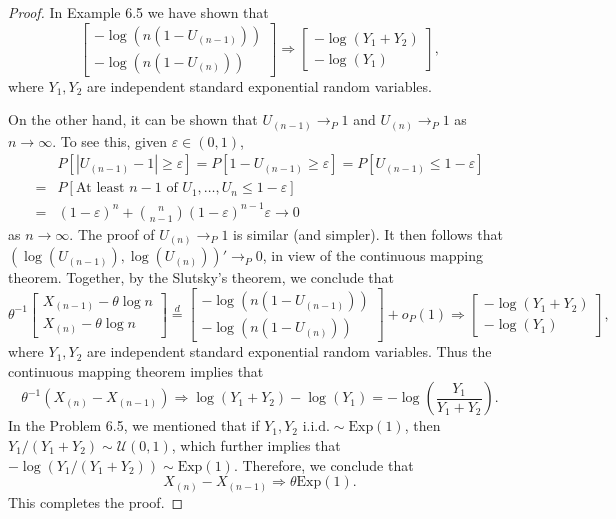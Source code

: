 \documentclass{article}
\newcommand{\eps}{\varepsilon}
\theoremstyle{definition}
\theoremstyle{plain}
\theoremstyle{remark}
\begin{document}
\begin{description}
\begin{description}
\begin{proof}
In Example 6.5 we have shown that 
\begin{equation*}
    \begin{bmatrix} 
    -\log(n(1 - U_{(n - 1)})) \\
    -\log(n(1 - U_{(n)})) 
    \end{bmatrix} \Rightarrow 
    \begin{bmatrix} 
    -\log(Y_1 + Y_2) \\
    -\log(Y_1)
    \end{bmatrix},
\end{equation*}
where $Y_1, Y_2$ are independent standard exponential random variables. 

On the other hand, it can be shown that $U_{(n - 1)} \to_P 1$ and $U_{(n)} 
\to_P 1$ as $n \to \infty$. To see this, given $\eps \in (0, 1)$, 
\begin{align*}
   & P[|U_{(n - 1)} - 1| \geq \eps] = P[1 - U_{(n - 1)} \geq \eps] = 
   P[U_{(n - 1)} \leq 1 - \eps] \\
   = & P[\text{At least $n - 1$ of } U_1, \ldots, U_n \leq 1 - \eps] \\
   = & (1 - \eps)^n + \binom{n}{n - 1}(1 - \eps)^{n - 1}\eps \to 0
\end{align*}
as $n \to \infty$. The proof of $U_{(n)} \to_P 1$ is similar (and simpler).
It then follows that $(\log(U_{(n - 1)}), \log(U_{(n)}))' \to_P 0$, in view of
the continuous mapping theorem. Together, by the Slutsky's theorem, we conclude
that
\begin{equation*}
    \theta^{-1}\begin{bmatrix}
    X_{(n - 1)} - \theta\log n \\
    X_{(n)} - \theta\log n
    \end{bmatrix} \overset{d}= 
    \begin{bmatrix} 
    -\log(n(1 - U_{(n - 1)})) \\
    -\log(n(1 - U_{(n)})) 
    \end{bmatrix} + o_P(1) \Rightarrow 
    \begin{bmatrix} 
    -\log(Y_1 + Y_2) \\
    -\log(Y_1)
    \end{bmatrix},
\end{equation*}
where $Y_1, Y_2$ are independent standard exponential random variables. Thus
the continuous mapping theorem implies that
\begin{equation*}
    \theta^{-1}(X_{(n)} - X_{(n - 1)}) \Rightarrow 
    \log(Y_1 + Y_2) - \log(Y_1) = -\log\left(\frac{Y_1}{Y_1 + Y_2}\right).
\end{equation*}
In the Problem 6.5, we mentioned that if $Y_1, Y_2 \text{ i.i.d.} \sim 
\text{Exp}(1)$, then $Y_1/(Y_1 + Y_2) \sim \mathcal{U}(0, 1)$, which further
implies that $-\log(Y_1/(Y_1 + Y_2)) \sim \text{Exp}(1)$. 
Therefore, we conclude that
\begin{equation}\label{hw10:eq1}
    X_{(n)} - X_{(n - 1)} \Rightarrow \theta\text{Exp}(1). 
\end{equation}
This completes the proof.
\end{proof}


\end{description}
\end{description}
\end{document}
